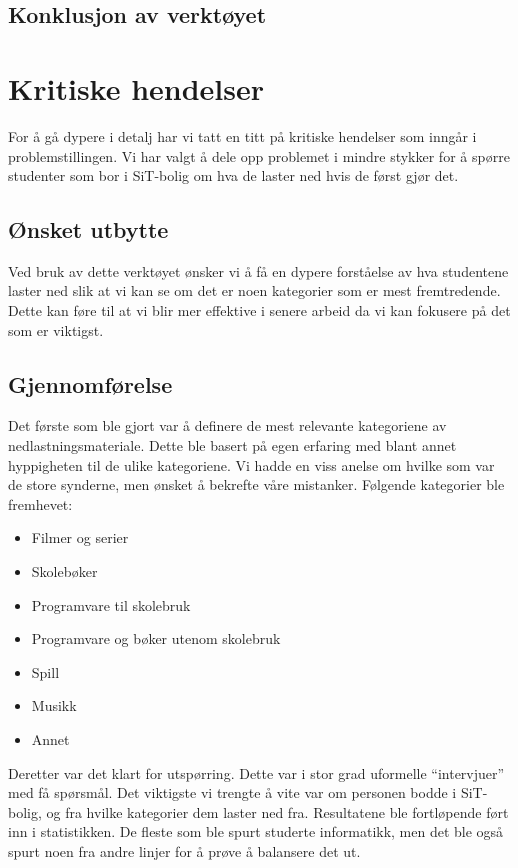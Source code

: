 \subsection{Konklusjon av verktøyet}


\section{Kritiske hendelser}
For å gå dypere i detalj har vi tatt en titt på kritiske hendelser som inngår i problemstillingen. Vi har valgt å dele opp problemet i mindre stykker for å spørre studenter som bor i SiT-bolig om hva de laster ned hvis de først gjør det. 

\subsection{Ønsket utbytte}
Ved bruk av dette verktøyet ønsker vi å få en dypere forståelse av hva studentene laster ned slik at vi kan se om det er noen kategorier som er mest fremtredende. Dette kan føre til at vi blir mer effektive i senere arbeid da vi kan fokusere på det som er viktigst.

\subsection{Gjennomførelse}
Det første som ble gjort var å definere de mest relevante kategoriene av nedlastningsmateriale. Dette ble basert på egen erfaring med blant annet hyppigheten til de ulike kategoriene. Vi hadde en viss anelse om hvilke som var de store synderne, men ønsket å bekrefte våre mistanker. Følgende kategorier ble fremhevet: 
\begin{itemize}
    \item Filmer og serier
    \item Skolebøker
    \item Programvare til skolebruk
    \item Programvare og bøker utenom skolebruk
    \item Spill
    \item Musikk
    \item Annet
\end{itemize}

Deretter var det klart for utspørring. Dette var i stor grad uformelle ``intervjuer'' med få spørsmål. Det viktigste vi trengte å vite var om personen bodde i SiT-bolig, og fra hvilke kategorier dem laster ned fra. Resultatene ble fortløpende ført inn i statistikken. De fleste som ble spurt studerte informatikk, men det ble også spurt noen fra andre linjer for å prøve å balansere det ut.

